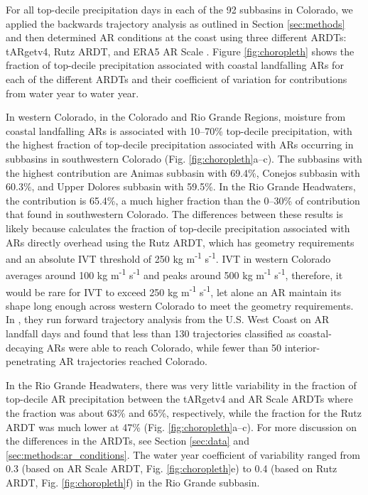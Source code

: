 \documentclass[draft]{agujournal2019}
\begin{document}
For all top-decile precipitation days in each of the 92 subbasins in Colorado, we applied the backwards trajectory analysis as outlined in Section \ref{sec:methods} and then determined AR conditions at the coast using three different ARDTs: tARgetv4, Rutz ARDT, and ERA5 AR Scale \cite{MartinRalph2019, Rutz2014, Guan2024AERA5}. Figure \ref{fig:choropleth} shows the fraction of top-decile precipitation associated with coastal landfalling ARs for each of the different ARDTs and their coefficient of variation for contributions from water year to water year. 

In western Colorado, in the Colorado and Rio Grande Regions, moisture from coastal landfalling ARs is associated with 10--70\% top-decile precipitation, with the highest fraction of top-decile precipitation associated with ARs occurring in subbasins in southwestern Colorado (Fig. \ref{fig:choropleth}a--c). The subbasins with the highest contribution are Animas subbasin with 69.4\%, Conejos subbasin with 60.3\%, and Upper Dolores subbasin with 59.5\%. In the Rio Grande Headwaters, the contribution is 65.4\%, a much higher fraction than the 0--30\% of contribution that  found in southwestern Colorado. The differences between these results is likely because  calculates the fraction of top-decile precipitation associated with ARs directly overhead using the Rutz ARDT, which has geometry requirements and an absolute IVT threshold of 250 kg m\textsuperscript{-1} s\textsuperscript{-1}. IVT in western Colorado averages around 100 kg m\textsuperscript{-1} s\textsuperscript{-1} and peaks around 500 kg m\textsuperscript{-1} s\textsuperscript{-1}, therefore, it would be rare for IVT to exceed 250 kg m\textsuperscript{-1} s\textsuperscript{-1}, let alone an AR maintain its shape long enough across western Colorado to meet the geometry requirements. In , they run forward trajectory analysis from the U.S. West Coast on AR landfall days and found that less than 130 trajectories classified as coastal-decaying ARs were able to reach Colorado, while fewer than 50 interior-penetrating AR trajectories reached Colorado.

In the Rio Grande Headwaters, there was very little variability in the fraction of top-decile AR precipitation between the tARgetv4 and AR Scale ARDTs where the fraction was about 63\% and 65\%, respectively, while the fraction for the Rutz ARDT was much lower at 47\% (Fig. \ref{fig:choropleth}a--c). For more discussion on the differences in the ARDTs, see Section \ref{sec:data} and \ref{sec:methods:ar_conditions}. The water year coefficient of variability ranged from 0.3 (based on AR Scale ARDT, Fig. \ref{fig:choropleth}e) to 0.4 (based on Rutz ARDT, Fig. \ref{fig:choropleth}f) in the Rio Grande subbasin.
\end{document}

